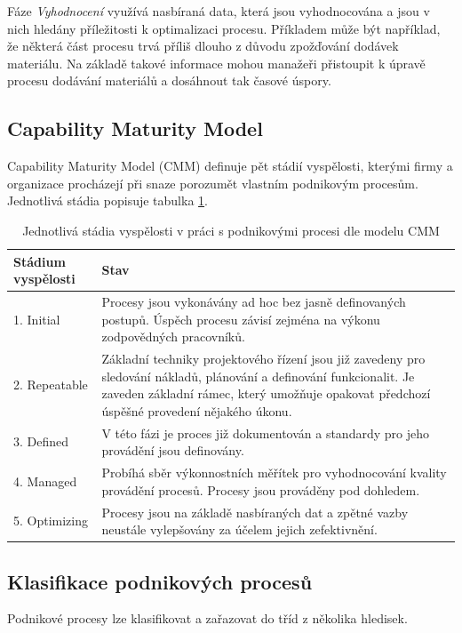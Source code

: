 \documentclass[]{article}
\begin{document}
Fáze \textit{Vyhodnocení} využívá nasbíraná data, která jsou vyhodnocována a jsou v nich hledány příležitosti k optimalizaci procesu. Příkladem může být například, že některá část procesu trvá příliš dlouho z důvodu zpožďování dodávek materiálu. Na základě takové informace mohou manažeři přistoupit k úpravě procesu dodávání materiálů a dosáhnout tak časové úspory.

\subsection{Capability Maturity Model}
Capability Maturity Model (CMM) definuje pět stádií vyspělosti, kterými firmy a organizace procházejí při snaze porozumět vlastním podnikovým procesům. Jednotlivá stádia popisuje tabulka \ref{tab:cmm}.


\begin{table}[H]\centering
  \caption{Jednotlivá stádia vyspělosti v práci s podnikovými procesi dle modelu CMM \cite{Harmon2014}}
  \label{tab:cmm}
  \begin{tabular}{ | l | p{10cm} | }
    \hline
    \textbf{Stádium vyspělosti} & \textbf{Stav} \\ \hline\hline
    1. Initial & Procesy jsou vykonávány ad hoc bez jasně definovaných postupů. \newline Úspěch procesu závisí zejména na výkonu zodpovědných pracovníků. \\ \hline
    2. Repeatable & Základní techniky projektového řízení jsou již zavedeny pro sledování nákladů, plánování a definování funkcionalit. Je zaveden základní rámec, který umožňuje opakovat předchozí úspěšné provedení nějakého úkonu.  \\ \hline
    3. Defined & V této fázi je proces již dokumentován a standardy pro jeho provádění jsou definovány. \\ \hline
    4. Managed & Probíhá sběr výkonnostních měřítek pro vyhodnocování kvality provádění procesů. Procesy jsou prováděny pod dohledem.  \\ \hline
    5. Optimizing & Procesy jsou na základě nasbíraných dat a zpětné vazby neustále vylepšovány za účelem jejich zefektivnění.  \\
    \hline
  \end{tabular}
\end{table}

\subsection{Klasifikace podnikových procesů}
Podnikové procesy lze klasifikovat a zařazovat do tříd z několika hledisek. 
\end{document}
